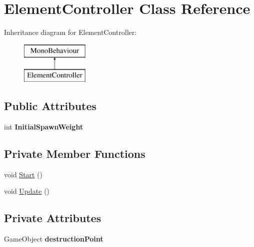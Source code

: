 \hypertarget{class_element_controller}{}\section{Element\+Controller Class Reference}
\label{class_element_controller}
Inheritance diagram for Element\+Controller\+:\begin{figure}[H]
\begin{center}
\leavevmode
\includegraphics[height=2.000000cm]{class_element_controller}
\end{center}
\end{figure}
\subsection*{Public Attributes}
\begin{DoxyCompactItemize}
\item 
\mbox{\label{class_element_controller_a7cafda6bb9a29d141d00cc807eb76807}} 
int {\bfseries Initial\+Spawn\+Weight}
\end{DoxyCompactItemize}
\subsection*{Private Member Functions}
\begin{DoxyCompactItemize}
\item 
void \mbox{\hyperlink{class_element_controller_afd67336e7c6bed51a83b74a6c62ee348}{Start}} ()
\item 
void \mbox{\hyperlink{class_element_controller_ada579475820b96bc8654ae02fa356578}{Update}} ()
\end{DoxyCompactItemize}
\subsection*{Private Attributes}
\begin{DoxyCompactItemize}
\item 
\mbox{\label{class_element_controller_a6b73abcef88eb3d6874570b38ce45bc6}} 
Game\+Object {\bfseries destruction\+Point}
\end{DoxyCompactItemize}


